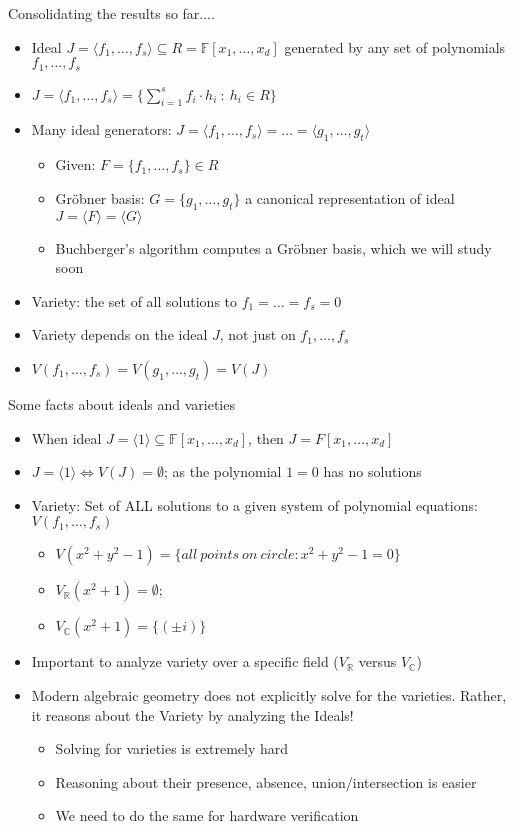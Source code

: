 \documentclass[xcolor=dvipsnames]{beamer}
\newcommand{\R}{{\mathbb{R}}}
\newcommand{\C}{{\mathbb{C}}}
\newcommand{\F}{{\mathbb{F}}}
\newcommand{\bi}{\begin{itemize}}
\newcommand{\ei}{\end{itemize}}
\begin{document}


\begin{frame}{{\large Consolidating the results so far....}}

\bi
\item Ideal $J = \langle f_1, \dots, f_s \rangle \subseteq R =\F[x_1,
  \dots,x_d]$ generated by any set of polynomials $f_1, \dots, f_s$ 
\item $J = \langle f_1, \dots, f_s \rangle = \{\sum_{i=1}^s f_i \cdot
  h_i ~:~ h_i \in  R\}$ 
\item Many ideal generators: $J = \langle f_1, \dots, f_s\rangle =
  \dots = \langle g_1, \dots, g_t\rangle$  
\bi
\item Given: $F = \{f_1, \dots, f_s\} \in R$
\item Gr\"obner basis: $G = \{g_1, \dots, g_t\}$ a canonical
  representation of ideal $J = \langle F \rangle = \langle G \rangle$
\item Buchberger's algorithm computes a Gr\"obner basis, which we will
  study soon
\ei
\item Variety: the set of all solutions to $f_1 = \dots = f_s =0$
\item Variety depends on the ideal $J$, not just on $f_1, \dots, f_s$
\item $V(f_1, \dots, f_s) = V(g_1, \dots, g_t) = V(J)$
\ei
\end{frame}

\begin{frame}{{\large Some facts about ideals and varieties}}

\bi
\item When ideal $J = \langle 1 \rangle \subseteq \F[x_1,\dots,x_d]$, 
then $J = F[x_1, \dots, x_d]$
\item  $J = \langle 1 \rangle \iff V(J) = \emptyset$; as the
  polynomial $1=0$ has no solutions
\item \alert{Variety:} Set of ALL solutions to a given system of
  polynomial equations: $V(f_1, \dots, f_s)$ 
	\begin{itemize}
	\item $V(x^2+y^2-1)=\{all\  points\  on\ circle: x^2+y^2-1=0\}$
	\item $V_{\mathbb{R}}(x^2+1)=\emptyset$; 
        \item $V_{\mathbb{C}}(x^2+1)=\{(\pm i)\}$
	\end{itemize}
\item Important to analyze variety over a specific field ($V_{\R}$
  versus $V_{\C}$)
\item Modern algebraic geometry does not \alert{explicitly solve for
  the varieties}. Rather, it reasons about the Variety by analyzing
  the Ideals! 
\bi
\item Solving for varieties is extremely hard
\item Reasoning about their presence, absence, union/intersection is
  easier
\item We need to do the same for hardware verification
\ei
\ei
\end{frame}
\end{document}
